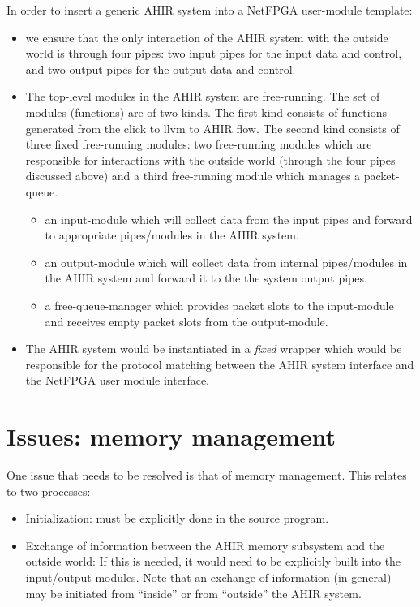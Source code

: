 \documentclass{article}
\begin{document}
In order to insert a generic AHIR system into a NetFPGA user-module template:
\begin{itemize}
\item we ensure that the only interaction of the AHIR system with the outside world is
through four pipes: two input pipes for the input data and control, and
two output pipes for the output data and control.
\item The top-level modules in the AHIR system are free-running.  
The set of modules (functions) are of two kinds.  The first
kind consists of functions generated from the click to llvm to AHIR
flow.  The second kind consists of three fixed free-running modules:
two free-running modules which are 
responsible for interactions with the outside world (through the four pipes
discussed above) and a third free-running module which manages a packet-queue.
\begin{itemize}
\item an input-module which will collect data from the input pipes and
forward to appropriate pipes/modules in the AHIR system.
\item an output-module which will collect data from internal pipes/modules
in the AHIR system and forward it to the the system output pipes.
\item a free-queue-manager which provides packet slots to the input-module
and receives empty packet slots from the output-module.
\end{itemize}
\item The AHIR system would be instantiated in a {\em fixed} wrapper
which would be responsible for the protocol matching between the AHIR
system interface and the NetFPGA user module interface.
\end{itemize}


\section{Issues: memory management}

One issue that needs to be resolved is that of memory management.
This relates to two processes:
\begin{itemize}
\item Initialization: must be explicitly done in 
the source program.
\item Exchange of information between the AHIR memory subsystem and
the outside world:  If this is needed, it would need to be explicitly 
built into the input/output modules.  Note that an exchange of
information (in general) may be initiated from ``inside'' or
from ``outside'' the AHIR system.
\end{itemize}
\end{document}
